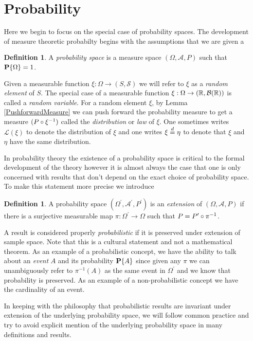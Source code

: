 \documentclass{amsart}
\theoremstyle{remark}
\theoremstyle{definition}
\newtheorem{defn}[thm]{Definition}
\begin{document}
\section{Probability}
Here we begin to focus on the special case of probability spaces.  The
development of measure theoretic probabilty begins with the
assumptions that we are given a
\begin{defn}A \emph{probability space} is a measure space $(\Omega,
  \mathcal{A}, P)$ such that $\textbf{P}\{\Omega\} = 1$.
\end{defn}
Given a measurable function $\xi : \Omega \to (S,
\mathcal{S})$ we will refer to $\xi$ as a \emph{random
  element} of $S$.  The special case of a measurable function $\xi : \Omega \to (\mathbb{R}, \mathcal{B}(\mathbb{R}))$
is called a \emph{random variable}.  For a random element $\xi$, by
Lemma \ref{PushforwardMeasure} we can
push forward the probability measure to get a measure $(P \circ \xi^{-1})$ called the \emph{distribution} or \emph{law} of $\xi$. One
sometimes writes $\mathcal{L}(\xi)$ to denote the distribution of
$\xi$ and one writes $\xi \overset{d}= \eta$ to denote that $\xi$ and $\eta$ have
the same distribution. 

In probability theory the existence of a probability space is critical
to the formal development of the theory however it is almost always
the case that one is only concerned with results that don't depend on
the exact choice of probability space.  To make this statement more
precise we introduce 
\begin{defn}A probability space $(\Omega^\prime, \mathcal{A}^\prime,
  P^\prime)$ is an \emph{extension} of $(\Omega, \mathcal{A},
  P)$ if there is a surjective measurable map $\pi : \Omega^\prime \to
  \Omega$ such that $P = P^\prime \circ \pi^{-1}$.
\end{defn}

A result is considered properly \emph{probabilistic} if it is
preserved under extension of sample space.  Note that this is a
cultural statement and not a mathematical theorem.  As an example of a
probabilistic concept, we have the ability to talk about an
\emph{event} $A$ and its probability $\textbf{P}\{A\}$ since given any
$\pi$  we can unambiguously refer to $\pi^{-1}(A)$ as the same event
in $\Omega^\prime$ and we know that probability is preserved.  As an
example of a non-probabilistic concept we have the cardinality of an
event.

In keeping with the philosophy that probabilistic results are
invariant under extension of the underlying probability space, we will
follow common practice and try to avoid explicit mention of the underlying
probability space in many definitions and results.  
\end{document}
